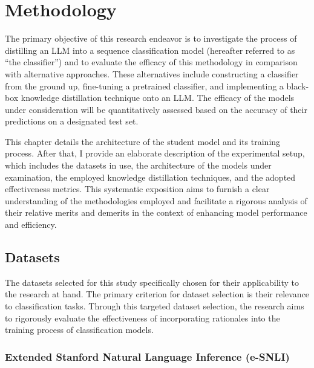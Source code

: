 \chapter{Methodology}
\label{chap:met}

The primary objective of this research endeavor is to investigate the process of distilling an LLM into a sequence classification model (hereafter referred to as ``the classifier'') and to evaluate the efficacy of this methodology in comparison with alternative approaches. These alternatives include constructing a classifier from the ground up, fine-tuning a pretrained classifier, and implementing a black-box knowledge distillation technique onto an LLM\@. The efficacy of the models under consideration will be quantitatively assessed based on the accuracy of their predictions on a designated test set.

This chapter details the architecture of the student model and its training process. After that, I provide an elaborate description of the experimental setup, which includes the datasets in use, the architecture of the models under examination, the employed knowledge distillation techniques, and the adopted effectiveness metrics. This systematic exposition aims to furnish a clear understanding of the methodologies employed and facilitate a rigorous analysis of their relative merits and demerits in the context of enhancing model performance and efficiency.

\section{Datasets}
\label{sec:datasets}

The datasets selected for this study specifically chosen for their applicability to the research at hand. The primary criterion for dataset selection is their relevance to classification tasks. Through this targeted dataset selection, the research aims to rigorously evaluate the effectiveness of incorporating rationales into the training process of classification models.

\subsection{Extended Stanford Natural Language Inference (e-SNLI)}
\label{sec:esnli}

